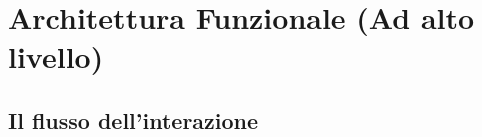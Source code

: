 \section{Architettura Funzionale (Ad alto livello)}
\label{sec:architettura}
%
%

\subsection{Il flusso dell'interazione}
\label{subsec:flusso}
%
%
%
%

